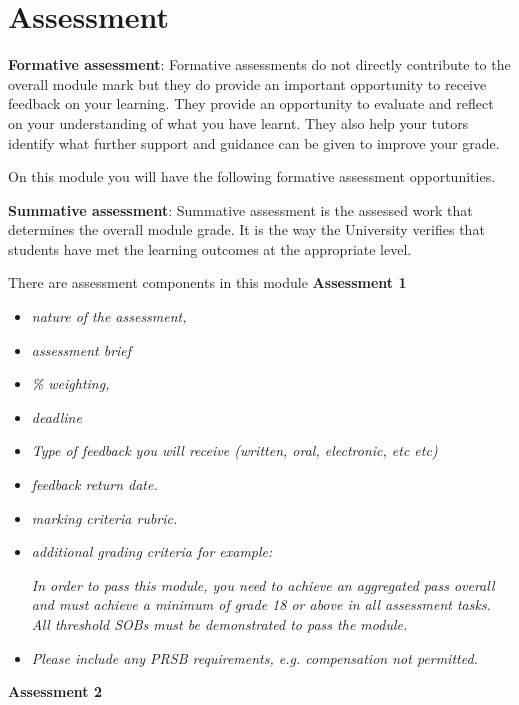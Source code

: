 \documentclass{MDXHandbook}
\begin{document}
\section{Assessment}
\textbf{Formative assessment}: Formative assessments do not directly contribute to the overall module mark but they do provide an important opportunity to receive feedback on your learning. They provide an opportunity to evaluate and reflect on your understanding of what you have learnt. They also help your tutors identify what further support and guidance can be given to improve your grade. 

On this module you will have the following formative assessment opportunities. 

\textbf{Summative assessment}: Summative assessment is the assessed work that determines the overall module grade. It is the way the University verifies that students have met the learning outcomes at the appropriate level. 

There are  assessment components in this module 
\textbf{Assessment 1}

\begin{itemize}
	\item \emph{nature of the assessment,}
	\item \emph{assessment brief}
	\item \emph{\% weighting, }
	\item \emph{deadline} 
	\item \emph{Type of feedback you will receive (written, oral, electronic, etc etc)}
	\item \emph{feedback return date. }
	\item \emph{marking criteria rubric. }
	\item \emph{additional grading criteria for example:}
	
	\emph{In order to pass this module, you need to achieve an aggregated pass overall and must achieve a minimum of grade 18 or above in all assessment tasks. 
	All threshold SOBs must be demonstrated to pass the module.}

	\item \emph{Please include any PRSB requirements, e.g. compensation not permitted. }
\end{itemize}
\textbf{Assessment 2 }
\end{document}
